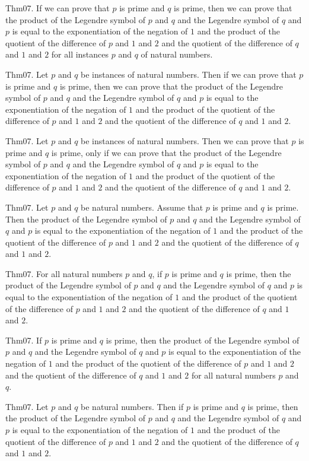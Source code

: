 \documentclass{article}
\begin{document}
Thm07. If we can prove that $p$ is prime and $q$ is prime, then we can prove that the product of the Legendre symbol of $p$ and $q$ and the Legendre symbol of $q$ and $p$ is equal to the exponentiation of the negation of $1$ and the product of the quotient of the difference of $p$ and $1$ and $2$ and the quotient of the difference of $q$ and $1$ and $2$ for all instances $p$ and $q$ of natural numbers.

Thm07. Let $p$ and $q$ be instances of natural numbers. Then if we can prove that $p$ is prime and $q$ is prime, then we can prove that the product of the Legendre symbol of $p$ and $q$ and the Legendre symbol of $q$ and $p$ is equal to the exponentiation of the negation of $1$ and the product of the quotient of the difference of $p$ and $1$ and $2$ and the quotient of the difference of $q$ and $1$ and $2$.

Thm07. Let $p$ and $q$ be instances of natural numbers. Then we can prove that $p$ is prime and $q$ is prime, only if we can prove that the product of the Legendre symbol of $p$ and $q$ and the Legendre symbol of $q$ and $p$ is equal to the exponentiation of the negation of $1$ and the product of the quotient of the difference of $p$ and $1$ and $2$ and the quotient of the difference of $q$ and $1$ and $2$.

Thm07. Let $p$ and $q$ be natural numbers. Assume that $p$ is prime and $q$ is prime. Then the product of the Legendre symbol of $p$ and $q$ and the Legendre symbol of $q$ and $p$ is equal to the exponentiation of the negation of $1$ and the product of the quotient of the difference of $p$ and $1$ and $2$ and the quotient of the difference of $q$ and $1$ and $2$.

Thm07. For all natural numbers $p$ and $q$, if $p$ is prime and $q$ is prime, then the product of the Legendre symbol of $p$ and $q$ and the Legendre symbol of $q$ and $p$ is equal to the exponentiation of the negation of $1$ and the product of the quotient of the difference of $p$ and $1$ and $2$ and the quotient of the difference of $q$ and $1$ and $2$.

Thm07. If $p$ is prime and $q$ is prime, then the product of the Legendre symbol of $p$ and $q$ and the Legendre symbol of $q$ and $p$ is equal to the exponentiation of the negation of $1$ and the product of the quotient of the difference of $p$ and $1$ and $2$ and the quotient of the difference of $q$ and $1$ and $2$ for all natural numbers $p$ and $q$.

Thm07. Let $p$ and $q$ be natural numbers. Then if $p$ is prime and $q$ is prime, then the product of the Legendre symbol of $p$ and $q$ and the Legendre symbol of $q$ and $p$ is equal to the exponentiation of the negation of $1$ and the product of the quotient of the difference of $p$ and $1$ and $2$ and the quotient of the difference of $q$ and $1$ and $2$.
\end{document}
